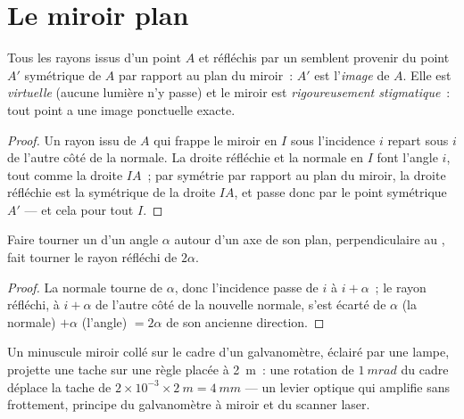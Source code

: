 \section{Le miroir plan}

\begin{proposition}\label{prop:b1:rays-reflection-refraction:mirror}
Tous les rayons issus d'un point $A$ et réfléchis par un 
semblent provenir du point $A'$ symétrique de $A$ par rapport au plan du
miroir~: $A'$ est l'\emph{image} de $A$. Elle est \emph{virtuelle}
(aucune lumière n'y passe) et le miroir est \emph{rigoureusement
stigmatique}~: tout point a une image ponctuelle exacte.
\end{proposition}

\begin{proof}
Un rayon issu de $A$ qui frappe le miroir en $I$ sous l'incidence $i$
repart sous $i$ de l'autre côté de la normale. La droite réfléchie et la
normale en $I$ font l'angle $i$, tout comme la droite $IA$~; par
symétrie par rapport au plan du miroir, la droite réfléchie est la
symétrique de la droite $IA$, et passe donc par le point symétrique $A'$
--- et cela pour tout $I$.
\end{proof}

\begin{proposition}\label{prop:b1:rays-reflection-refraction:rotation}
Faire tourner un  d'un angle $\alpha$ autour d'un axe de son
plan, perpendiculaire au , fait tourner le rayon
réfléchi de $2\alpha$.
\end{proposition}

\begin{proof}
La normale tourne de $\alpha$, donc l'incidence passe de $i$ à
$i + \alpha$~; le rayon réfléchi, à $i + \alpha$ de l'autre côté de la
nouvelle normale, s'est écarté de $\alpha$ (la normale) $+ \alpha$
(l'angle) $=
2\alpha$ de son ancienne direction.
\end{proof}

\begin{example}\label{ex:b1:rays-reflection-refraction:galvanometer}
Un minuscule miroir collé sur le cadre d'un galvanomètre, éclairé par
une lampe, projette une tache sur une règle placée à \qty{2}{m}~: une
rotation de $\qty{1}{mrad}$ du cadre déplace la tache de $2 \times 10^{-3} \times
\qty{2}{m} = \qty{4}{mm}$ --- un levier optique qui amplifie sans
frottement, principe du galvanomètre à miroir et du scanner laser.
\end{example}

